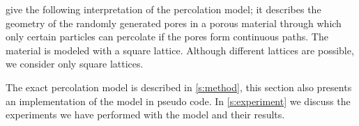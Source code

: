 \noindent \textcite{kenzel1997physics} give the following interpretation of the percolation model; it describes the geometry of the randomly generated pores in a porous material through which only certain particles can percolate if the pores form continuous paths. The material is modeled with a square lattice. Although different lattices are possible, we consider only square lattices. 

The exact percolation model is described in \cref{s:method}, this section also presents an implementation of the model in pseudo code. In \cref{s:experiment} we discuss the experiments we have performed with the model and their results. 
